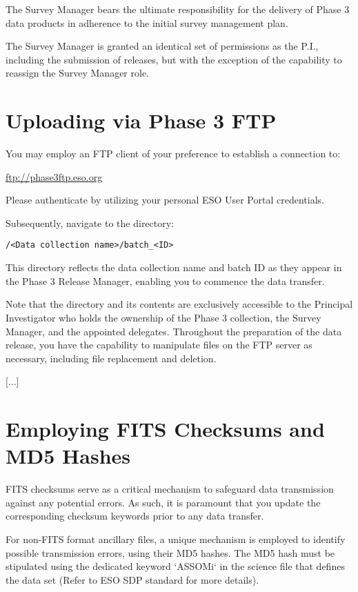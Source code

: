 \documentclass[a4paper,10pt]{book}
\begin{document}
The Survey Manager bears the ultimate responsibility for the delivery of Phase 3 data products in adherence to the initial survey management plan.

The Survey Manager is granted an identical set of permissions as the P.I., including the submission of releases, but with the exception of the capability to reassign the Survey Manager role.

\section{Uploading via Phase 3 FTP}

You may employ an FTP client of your preference to establish a connection to:

\url{ftp://phase3ftp.eso.org}

Please authenticate by utilizing your personal ESO User Portal credentials.

Subsequently, navigate to the directory:

\texttt{/<Data collection name>/batch\_<ID>}

This directory reflects the data collection name and batch ID as they appear in the Phase 3 Release Manager, enabling you to commence the data transfer.

Note that the directory and its contents are exclusively accessible to the Principal Investigator who holds the ownership of the Phase 3 collection, the Survey Manager, and the appointed delegates. Throughout the preparation of the data release, you have the capability to manipulate files on the FTP server as necessary, including file replacement and deletion.

[...]

\section{Employing FITS Checksums and MD5 Hashes}

FITS checksums serve as a critical mechanism to safeguard data transmission against any potential errors. As such, it is paramount that you update the corresponding checksum keywords prior to any data transfer.

For non-FITS format ancillary files, a unique mechanism is employed to identify possible transmission errors, using their MD5 hashes. The MD5 hash must be stipulated using the dedicated keyword `ASSOMi` in the science file that defines the data set (Refer to ESO SDP standard for more details).
\end{document}

